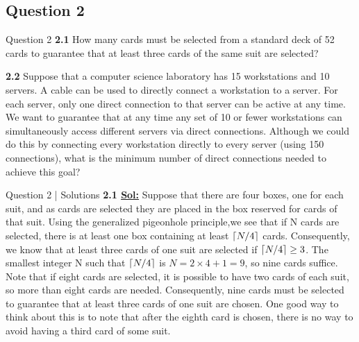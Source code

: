 \documentclass[xcolor=svgnames]{beamer}
\DeclarePairedDelimiter\ceil{\lceil}{\rceil}
\begin{document}
\subsection{Question 2}


\begin{frame}{Question 2}
    \textbf{2.1} How many cards must be selected from a standard deck of 52 cards to guarantee that at least three cards of the same suit are selected?
    
    \textbf{2.2} Suppose that a computer science laboratory has 15 workstations and 10 servers. A cable can be used to directly connect a workstation to a server. For each server, only one direct connection to that server can be active at any time. We want to guarantee that at any time any set of 10 or fewer workstations can simultaneously access different servers via direct connections. Although we could do this by connecting every workstation directly to every server (using 150 connections), what is the minimum number of direct connections needed to achieve this goal?
\end{frame}

\begin{frame}{Question 2 | Solutions}
    \textbf{2.1 \underline{Sol:}} Suppose that there are four boxes, one for each suit, and as cards are selected they are placed in the box reserved for cards of that suit.  Using the generalized pigeonhole principle,we see that if N cards are selected, there is at least one box containing at least $\ceil{N/4}$ cards. Consequently, we know that at least three cards of one suit are selected if $\ceil{N/4} \geq 3$. The smallest integer N such that $\ceil{N/4}$ is $N = 2 \times 4 + 1 = 9$, so nine cards suffice. Note that if eight cards are selected, it is possible to have two cards of each suit, so more than eight cards are needed. Consequently, nine cards must be selected to guarantee that at least three cards of one suit are chosen. One good way to think about this is to note that after the eighth card is chosen, there is no way to avoid having a third card of some suit.
\end{frame}
\end{document}
